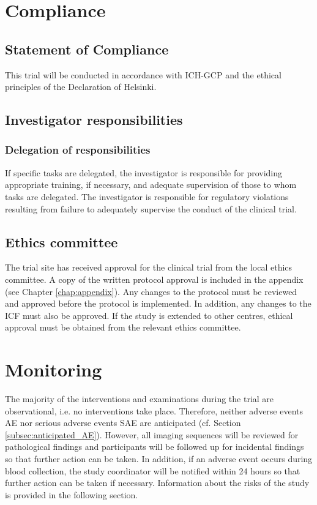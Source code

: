 \section{Compliance}
\subsection{Statement of Compliance}
This trial will be conducted in accordance with ICH-GCP and the ethical principles of the Declaration of Helsinki.

\subsection{Investigator responsibilities}

\subsubsection{Delegation of responsibilities}
If specific tasks are delegated, the investigator is responsible for providing appropriate training, if necessary, and adequate supervision of those to whom tasks are delegated. The investigator is responsible for regulatory violations resulting from failure to adequately supervise the conduct of the clinical trial.

\subsection{Ethics committee}
The trial site has received approval for the clinical trial from the local ethics committee. A copy of the written protocol approval is included in the appendix (see Chapter \ref{chap:appendix}). Any changes to the protocol must be reviewed and approved before the protocol is implemented. In addition, any changes to the \ac{ICF} must also be approved. If the study is extended to other centres, ethical approval must be obtained from the relevant ethics committee.

\section{Monitoring}
The majority of the interventions and examinations during the trial are observational, i.e. no interventions take place. Therefore, neither adverse events \ac{AE} nor serious adverse events \ac{SAE} are anticipated (cf. Section \ref{subsec:anticipated_AE}). However, all imaging sequences will be reviewed for pathological findings and participants will be followed up for incidental findings so that further action can be taken. In addition, if an adverse event occurs during blood collection, the study coordinator will be notified within 24 hours so that further action can be taken if necessary. Information about the risks of the study is provided in the following section.

